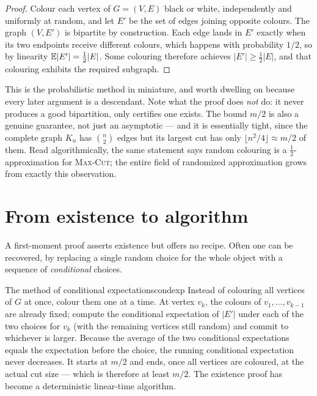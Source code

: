 \begin{proof}
Colour each vertex of $G=(V,E)$ black or white, independently and uniformly at
random, and let $E'$ be the set of edges joining opposite colours. The graph
$(V,E')$ is bipartite by construction. Each edge lands in $E'$ exactly when its
two endpoints receive different colours, which happens with probability
$1/2$, so by linearity $\mathbb{E}|E'|=\tfrac12|E|$. Some colouring therefore achieves
$|E'|\ge\tfrac12|E|$, and that colouring exhibits the required subgraph.
\end{proof}

\begin{insight}
This is the probabilistic method in miniature, and worth dwelling on because
every later argument is a descendant. Note what the proof does \emph{not} do:
it never produces a good bipartition, only certifies one exists. The bound
$m/2$ is also a genuine guarantee, not just an asymptotic --- and it is
essentially tight, since the complete graph $K_n$ has $\binom n2$ edges but its
largest cut has only $\lfloor n^2/4\rfloor\approx m/2$ of them. Read
algorithmically, the same statement says random colouring is a
$\tfrac12$-approximation for \textsc{Max-Cut}; the entire field of randomized
approximation grows from exactly this observation.
\end{insight}

\section{From existence to algorithm}

A first-moment proof asserts existence but offers no recipe. Often one can be
recovered, by replacing a single random choice for the whole object with a
sequence of \emph{conditional} choices.

\begin{remark}{The method of conditional expectations}{condexp}
Instead of colouring all vertices of $G$ at once, colour them one at a time. At
vertex $v_k$, the colours of $v_1,\dots,v_{k-1}$ are already fixed; compute the
conditional expectation of $|E'|$ under each of the two choices for $v_k$
(with the remaining vertices still random) and commit to whichever is larger.
Because the average of the two conditional expectations equals the expectation
before the choice, the running conditional expectation never decreases. It
starts at $m/2$ and ends, once all vertices are coloured, at the actual cut
size --- which is therefore at least $m/2$. The existence proof has become a
deterministic linear-time algorithm.
\end{remark}


